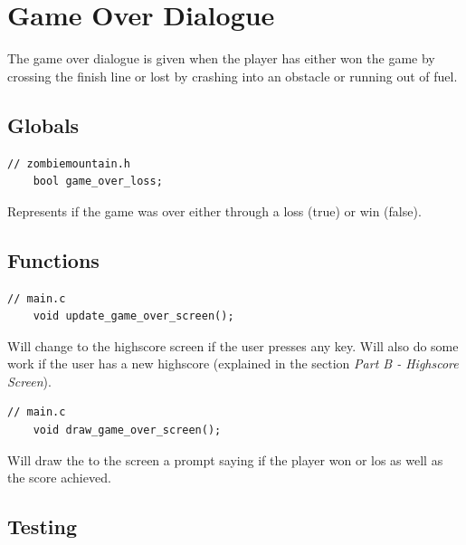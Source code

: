 \documentclass{article}
\begin{document}
\clearpage


\section{Game Over Dialogue}
The game over dialogue is given when the player has either won the game by crossing the finish line or lost by crashing into an obstacle or running out of fuel. 

\subsection*{Globals}
\begin{lstlisting}[style=CStyle]
	// zombiemountain.h
	bool game_over_loss;
\end{lstlisting}
Represents if the game was over either through a loss (true) or win (false).
\newline

\subsection*{Functions}
\begin{lstlisting}[style=CStyle]
	// main.c
	void update_game_over_screen();
\end{lstlisting}
Will change to the highscore screen if the user presses any key. Will also do some work if the user has a new highscore (explained in the section \emph{Part B - Highscore Screen}).
\begin{lstlisting}[style=CStyle]
	// main.c
	void draw_game_over_screen();
\end{lstlisting}
Will draw the to the screen a prompt saying if the player won or los as well as the score achieved. 
\newline

\subsection*{Testing}
\end{document}
